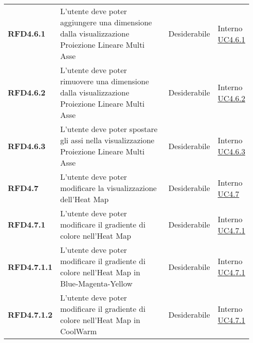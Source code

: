 \begin{longtable}[H]{| >{\raggedright\bfseries}m{20mm} | >{\raggedright}m{90mm} | >{\centering}m{25mm} | >{\centering\arraybackslash}m{30mm}|}
    RFD4.6.1
     & L'utente deve poter aggiungere una dimensione dalla visualizzazione Proiezione Lineare Multi Asse
     & Desiderabile
     & \makecell{ Interno                                                                                                \\  \hyperref[par:uc4.6.1]{UC4.6.1} }\\

    RFD4.6.2
     & L'utente deve poter rimuovere una dimensione dalla visualizzazione Proiezione Lineare Multi Asse
     & Desiderabile
     & \makecell{ Interno                                                                                                \\  \hyperref[par:uc4.6.2]{UC4.6.2} }\\

    RFD4.6.3
     & L'utente deve poter spostare gli assi nella visualizzazione Proiezione Lineare Multi Asse
     & Desiderabile
     & \makecell{ Interno                                                                                                \\  \hyperref[par:uc4.6.3]{UC4.6.3} }\\

    RFD4.7
     & L'utente deve poter modificare la visualizzazione dell'Heat Map
     & Desiderabile
     & \makecell{ Interno                                                                                                \\  \hyperref[ssub:uc4.7]{UC4.7} }\\

    RFD4.7.1
     & L'utente deve poter modificare il gradiente di colore nell'Heat Map
     & Desiderabile
     & \makecell{ Interno                                                                                                \\  \hyperref[par:uc4.7.1]{UC4.7.1} }\\

    RFD4.7.1.1
     & L'utente deve poter modificare il gradiente di colore nell'Heat Map in Blue-Magenta-Yellow
     & Desiderabile
     & \makecell{ Interno                                                                                                \\  \hyperref[par:uc4.7.1]{UC4.7.1} }\\

    RFD4.7.1.2
     & L'utente deve poter modificare il gradiente di colore nell'Heat Map in CoolWarm
     & Desiderabile
     & \makecell{ Interno                                                                                                \\  \hyperref[par:uc4.7.1]{UC4.7.1} }\\


\end{longtable}
